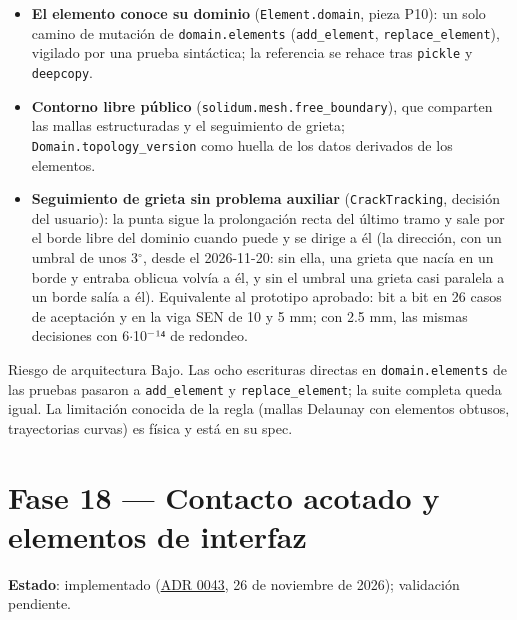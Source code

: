 \documentclass[11pt,oneside]{report}
\begin{document}
\begin{itemize}
  \item \textbf{El elemento conoce su dominio} (\texttt{Element.domain}, pieza P10): un solo camino de mutación de \texttt{domain.elements} (\texttt{add\_element}, \texttt{replace\_element}), vigilado por una prueba sintáctica; la referencia se rehace tras \texttt{pickle} y \texttt{deepcopy}.
  \item \textbf{Contorno libre público} (\texttt{solidum.\allowbreak{}mesh.\allowbreak{}free\_\allowbreak{}boundary}), que comparten las mallas estructuradas y el seguimiento de grieta; \texttt{Domain.\allowbreak{}topology\_\allowbreak{}version} como huella de los datos derivados de los elementos.
  \item \textbf{Seguimiento de grieta sin problema auxiliar} (\texttt{CrackTracking}, decisión del usuario): la punta sigue la prolongación recta del último tramo y sale por el borde libre del dominio cuando puede y se dirige a él (la dirección, con un umbral de unos 3\ensuremath{^{\circ}}, desde el 2026-11-20: sin ella, una grieta que nacía en un borde y entraba oblicua volvía a él, y sin el umbral una grieta casi paralela a un borde salía a él). Equivalente al prototipo aprobado: bit a bit en 26 casos de aceptación y en la viga SEN de 10 y 5 mm; con 2.5 mm, las mismas decisiones con 6\ensuremath{\cdot}10\ensuremath{^{-}}¹⁴ de redondeo.
\end{itemize}

\begin{infobox}{Riesgo de arquitectura}
Bajo. Las ocho escrituras directas en \texttt{domain.elements} de las pruebas pasaron a \texttt{add\_element} y \texttt{replace\_element}; la suite completa queda igual. La limitación conocida de la regla (mallas Delaunay con elementos obtusos, trayectorias curvas) es física y está en su spec.
\end{infobox}

\section{Fase 18 --- Contacto acotado y elementos de interfaz}

\textbf{Estado}: implementado (\hyperref[adr:0043]{ADR 0043}, 26 de noviembre de 2026); validación pendiente.
\end{document}
